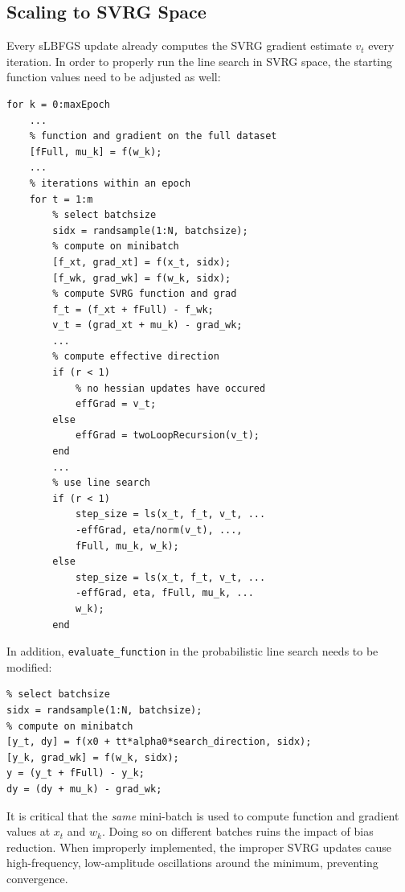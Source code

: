 \documentclass{article}
\begin{document}
\subsection{Scaling to SVRG Space}
Every sLBFGS update already computes the SVRG gradient estimate $v_t$ every iteration. In order to properly run the line search in SVRG space, the starting function values need to be adjusted as well:
\begin{lstlisting}
for k = 0:maxEpoch
	...
	% function and gradient on the full dataset
	[fFull, mu_k] = f(w_k);
	...
	% iterations within an epoch
	for t = 1:m
		% select batchsize 
		sidx = randsample(1:N, batchsize);
		% compute on minibatch
		[f_xt, grad_xt] = f(x_t, sidx);
		[f_wk, grad_wk] = f(w_k, sidx);
		% compute SVRG function and grad
		f_t = (f_xt + fFull) - f_wk;
		v_t = (grad_xt + mu_k) - grad_wk;
		...
		% compute effective direction
		if (r < 1)
			% no hessian updates have occured
			effGrad = v_t;
		else
			effGrad = twoLoopRecursion(v_t);
		end
		...
		% use line search
		if (r < 1)
			step_size = ls(x_t, f_t, v_t, ...
			-effGrad, eta/norm(v_t), ..., 
			fFull, mu_k, w_k);
		else
			step_size = ls(x_t, f_t, v_t, ...
			-effGrad, eta, fFull, mu_k, ...
			w_k);
		end
\end{lstlisting}
In addition, \texttt{evaluate_function} in the probabilistic line search needs to be modified:
\begin{lstlisting}
% select batchsize
sidx = randsample(1:N, batchsize);
% compute on minibatch
[y_t, dy] = f(x0 + tt*alpha0*search_direction, sidx);
[y_k, grad_wk] = f(w_k, sidx);
y = (y_t + fFull) - y_k;
dy = (dy + mu_k) - grad_wk;
\end{lstlisting}
It is critical that the \emph{same} mini-batch is used to compute function and gradient values at $x_t$ and $w_k$. Doing so on different batches ruins the impact of bias reduction. When improperly implemented, the improper SVRG updates cause high-frequency, low-amplitude oscillations around the minimum, preventing convergence.
\end{document}
